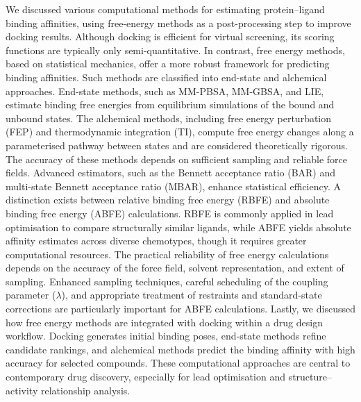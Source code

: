 \documentclass[12pt]{article}
\begin{document}
We discussed various computational methods for estimating protein–ligand binding affinities, using free-energy methods as a post-processing step to improve docking results. Although docking is efficient for virtual screening, its scoring functions are typically only semi-quantitative. In contrast, free energy methods, based on statistical mechanics, offer a more robust framework for predicting binding affinities. Such methods are classified into end-state and alchemical approaches. End-state methods, such as MM-PBSA, MM-GBSA, and LIE, estimate binding free energies from equilibrium simulations of the bound and unbound states. The alchemical methods, including free energy perturbation (FEP) and thermodynamic integration (TI), compute free energy changes along a parameterised pathway between states and are considered theoretically rigorous. The accuracy of these methods depends on sufficient sampling and reliable force fields. Advanced estimators, such as the Bennett acceptance ratio (BAR) and multi-state Bennett acceptance ratio (MBAR), enhance statistical efficiency. A distinction exists between relative binding free energy (RBFE) and absolute binding free energy (ABFE) calculations. RBFE is commonly applied in lead optimisation to compare structurally similar ligands, while ABFE yields absolute affinity estimates across diverse chemotypes, though it requires greater computational resources. The practical reliability of free energy calculations depends on the accuracy of the force field, solvent representation, and extent of sampling. Enhanced sampling techniques, careful scheduling of the coupling parameter ($\lambda$), and appropriate treatment of restraints and standard-state corrections are particularly important for ABFE calculations. Lastly, we discussed how free energy methods are integrated with docking within a drug design workflow. Docking generates initial binding poses, end-state methods refine candidate rankings, and alchemical methods predict the binding affinity with high accuracy for selected compounds. These computational approaches are central to contemporary drug discovery, especially for lead optimisation and structure–activity relationship analysis.



\end{document}
